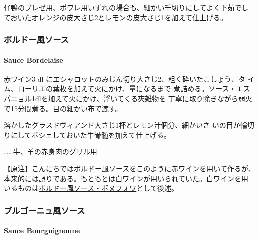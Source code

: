 \begin{recette}
仔鴨のブレゼ用、ポワレ用いずれの場合も、細かい千切りにしてよく下茹でし
ておいたオレンジの皮大さじ2とレモンの皮大さじ1を加えて仕上げる。

\maeaki

\hypertarget{ux30dcux30ebux30c9ux30fcux98a8ux30bdux30fcux30b9}{%
\subsubsection{ボルドー風ソース}\label{ux30dcux30ebux30c9ux30fcux98a8ux30bdux30fcux30b9}}

\hypertarget{sauce-bordelaise}{%
\paragraph{Sauce Bordelaise}\label{sauce-bordelaise}}

   

赤ワイン3 dl にエシャロットのみじん切り大さじ2、粗く砕いたこしょう、タ
イム、ローリエの葉\undemi{}枚を加えて火にかけ、\unquart{}量になるまで
煮詰める。ソース・エスパニョル1dlを加えて火にかけ、浮いてくる夾雑物を
丁寧に取り除きながら弱火で15分間煮る。目の細かい布で漉す。

溶かしたグラスドヴィアンド大さじ1杯とレモン汁\unquart{}個分、細かいさ
いの目か輪切りにしてポシェしておいた牛骨髄を加えて仕上げる。

\ldots{}\ldots{}牛、羊の赤身肉のグリル用

【原注】こんにちではボルドー風ソースをこのように赤ワインを用いて作るが、
本来的には誤りである。もともとは白ワインが用いられていた。白ワインを用
いるものは\protect\hyperlink{sauce-bonnefoy}{ボルドー風ソース・ボヌフォワ}として後述。

\maeaki

\hypertarget{ux30d6ux30ebux30b4ux30fcux30cbux30e5ux98a8ux30bdux30fcux30b9}{%
\subsubsection{ブルゴーニュ風ソース}\label{ux30d6ux30ebux30b4ux30fcux30cbux30e5ux98a8ux30bdux30fcux30b9}}

\hypertarget{sauce-bourguignonne}{%
\paragraph{Sauce Bourguignonne}\label{sauce-bourguignonne}}


\end{recette}
